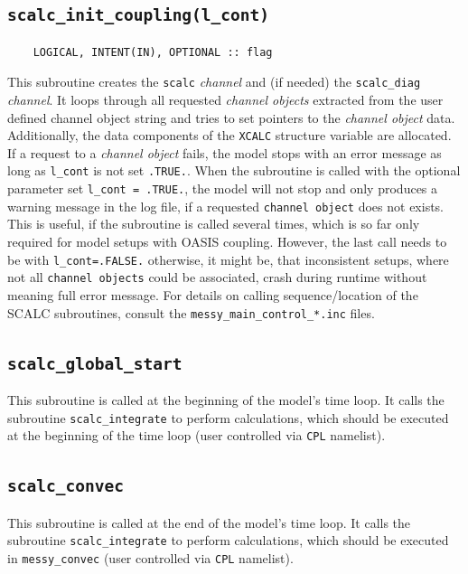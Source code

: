 \documentclass[twoside]{article}
\begin{document}
\subsection{{\tt scalc\_init\_coupling(l\_cont)}}
\label{sec:scalc_init_coupling}
%
\begin{verbatim}
    LOGICAL, INTENT(IN), OPTIONAL :: flag
\end{verbatim}
This subroutine creates the {\tt scalc} {\it channel} and (if needed) the {\tt scalc\_diag} {\it channel}.
It loops through all requested {\it channel objects} extracted from the user defined channel object string and tries to set pointers to the {\it channel object} data.
Additionally, the data components of the {\tt XCALC} structure variable are allocated.
If a request to a {\it channel object} fails, the model stops with an error message as long as {\tt l\_cont} is not set {\tt .TRUE.}.
When the subroutine is called with the optional parameter set {\tt l\_cont = .TRUE.}, the model will not stop and only produces a warning message in the log file, if a requested {\tt channel object} does not exists.
This is useful, if the subroutine is called several times, which is so far only required for model setups with OASIS coupling.
However, the last call needs to be with {\tt l\_cont=.FALSE.} otherwise, it might be, that inconsistent setups, where not all {\tt channel objects} could be associated, crash during runtime without meaning full error message.
For details on calling sequence/location of the SCALC subroutines, consult the {\tt messy\_main\_control\_*.inc} files.
%
\subsection{{\tt scalc\_global\_start}}
\label{sec:scalc_global_start}
%
This subroutine is called at the beginning of the model's time loop.
It calls the subroutine {\tt scalc\_integrate} to perform calculations, which should be executed at the beginning of the time loop (user controlled via {\tt CPL} namelist).
%
\subsection{{\tt scalc\_convec}}
\label{sec:scalc_convec}
%
This subroutine is called at the end of the model's time loop.
It calls the subroutine {\tt scalc\_integrate} to perform calculations, which should be executed in {\tt messy\_convec} (user controlled via {\tt CPL} namelist).
%
\end{document}
